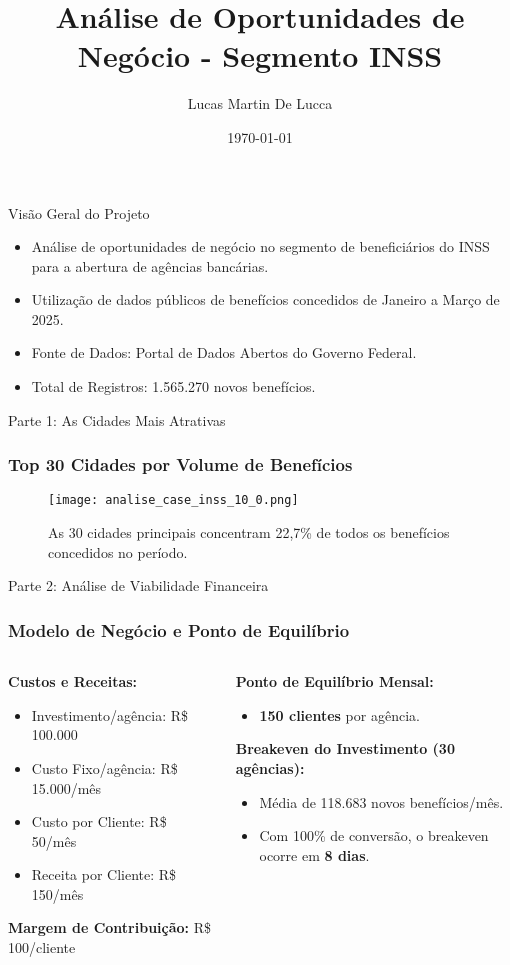 \documentclass{beamer}
\title{Análise de Oportunidades de Negócio - Segmento INSS}
\author{Lucas Martin De Lucca}
\date{\today}
\begin{document}
\begin{frame}
  \titlepage
\end{frame}

\begin{frame}{Visão Geral do Projeto}
  \begin{itemize}
    \item Análise de oportunidades de negócio no segmento de beneficiários do INSS para a abertura de agências bancárias.
    \item Utilização de dados públicos de benefícios concedidos de Janeiro a Março de 2025.
    \item Fonte de Dados: Portal de Dados Abertos do Governo Federal.
    \item Total de Registros: 1.565.270 novos benefícios.
  \end{itemize}
\end{frame}

\begin{frame}{Parte 1: As Cidades Mais Atrativas}
  \frametitle{Top 30 Cidades por Volume de Benefícios}
  \begin{figure}
    \texttt{[image: analise\_case\_inss\_10\_0.png]}
    \caption{As 30 cidades principais concentram 22,7\% de todos os benefícios concedidos no período.}
  \end{figure}
\end{frame}

\begin{frame}{Parte 2: Análise de Viabilidade Financeira}
  \frametitle{Modelo de Negócio e Ponto de Equilíbrio}
  \begin{columns}
    \begin{column}{0.5\textwidth}
      \textbf{Custos e Receitas:}
      \begin{itemize}
        \item Investimento/agência: R\$ 100.000
        \item Custo Fixo/agência: R\$ 15.000/mês
        \item Custo por Cliente: R\$ 50/mês
        \item Receita por Cliente: R\$ 150/mês
      \end{itemize}
      \vfill
      \textbf{Margem de Contribuição:} R\$ 100/cliente
    \end{column}
    \begin{column}{0.5\textwidth}
      \textbf{Ponto de Equilíbrio Mensal:}
      \begin{itemize}
        \item \textbf{150 clientes} por agência.
      \end{itemize}
      \vfill
      \textbf{Breakeven do Investimento (30 agências):}
      \begin{itemize}
        \item Média de 118.683 novos benefícios/mês.
        \item Com 100\% de conversão, o breakeven ocorre em \textbf{8 dias}.
      \end{itemize}
  \end{column}
  \end{columns}
\end{frame}
\end{document}
